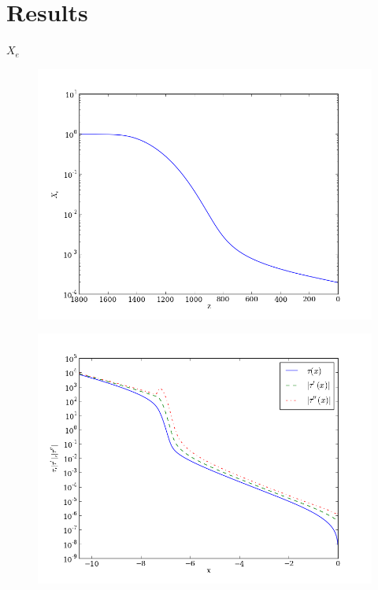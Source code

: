 \documentclass{aa}   %
\begin{document}
\section{Results}\label{sec:simulate_analytic}

$X_e$

  \begin{figure}[ht]
   \includegraphics[width=.49\textwidth]{X_e.png}
   \caption{}
  \label{figure0}
  \end{figure}

 
   \begin{figure}[ht]
   \includegraphics[width=.49\textwidth]{tau.png}
   \caption{}
  \label{figure1}
  \end{figure}
 
\end{document}

